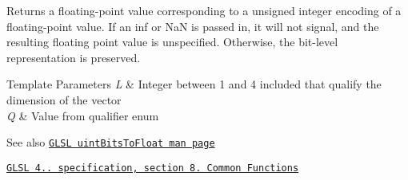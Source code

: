 Returns a floating-\/point value corresponding to a unsigned integer encoding of a floating-\/point value. If an inf or NaN is passed in, it will not signal, and the resulting floating point value is unspecified. Otherwise, the bit-\/level representation is preserved.


\begin{DoxyTemplParams}{Template Parameters}
{\em L} & Integer between 1 and 4 included that qualify the dimension of the vector \\
\hline
{\em Q} & Value from qualifier enum\\
\hline
\end{DoxyTemplParams}
\begin{DoxySeeAlso}{See also}
\href{http://www.opengl.org/sdk/docs/manglsl/xhtml/uintBitsToFloat.xml}{\tt G\+L\+SL uint\+Bits\+To\+Float man page} 

\href{http://www.opengl.org/registry/doc/GLSLangSpec.4.20.8.pdf}{\tt G\+L\+SL 4.. specification, section 8. Common Functions} 
\end{DoxySeeAlso}

